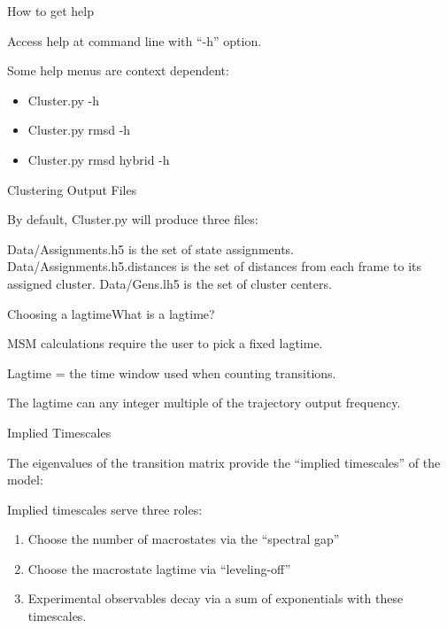 \documentclass[10pt]{beamer}
\begin{document}
\begin{frame}{How to get help}

Access help at command line with ``-h'' option.


Some help menus are context dependent:

\begin{itemize}
 \item Cluster.py -h
 \item Cluster.py rmsd -h
 \item Cluster.py rmsd hybrid -h
\end{itemize}


\end{frame}



\begin{frame}[fragile]{Clustering Output Files}

By default, Cluster.py will produce three files:

\vfill
 Data/Assignments.h5 is the set of state assignments.
\vfill 
 Data/Assignments.h5.distances is the set of distances from each frame to its assigned cluster.
 \vfill
 Data/Gens.lh5 is the set of cluster centers.
 
\end{frame}


\begin{frame}{Choosing a lagtime}{What is a lagtime?}
 
MSM calculations require the user to pick a fixed lagtime.

\vfill

Lagtime = the time window used when counting transitions.

\vfill

The lagtime can any integer multiple of the trajectory output frequency.

\end{frame}

\begin{frame}{Implied Timescales}
 
 The eigenvalues of the transition matrix provide the ``implied timescales'' of the model:
 
 \vfill
 
 Implied timescales serve three roles:
 
\begin{enumerate}
 \item Choose the number of macrostates via the ``spectral gap''
 \item Choose the macrostate lagtime via ``leveling-off''
 \item Experimental observables decay via a sum of exponentials with these timescales.
\end{enumerate}

\end{frame}
\end{document}
